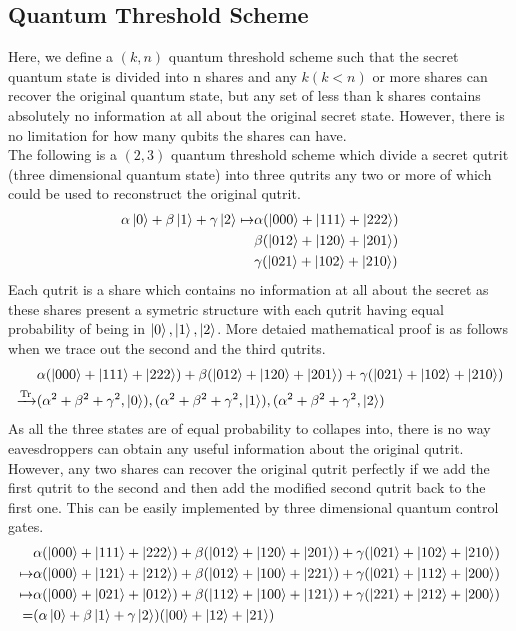\documentclass[12pt]{article}
\begin{document}
\subsection{Quantum Threshold Scheme}
Here, we define a $(k,n)$ quantum threshold scheme such that the secret quantum state is divided into n shares and any $k (k < n)$ or more shares can recover the original quantum state, but any set of less than k shares contains absolutely no information at all about the original secret state.
However, there is no limitation for how many qubits the shares can have.
\\
The following is a $(2,3)$ quantum threshold scheme which divide a secret qutrit (three dimensional quantum state) into three qutrits any two or more of which could be used to reconstruct the original qutrit.
\begin{align}
	\alpha \ket{0} + \beta \ket{1} + \gamma \ket{2} \mapsto
	& \alpha ( \ket{000} + \ket{111} + \ket{222} ) \nonumber \\
	& \beta  ( \ket{012} + \ket{120} + \ket{201} ) \nonumber \\
	& \gamma ( \ket{021} + \ket{102} + \ket{210} ) 
\end{align}
Each qutrit is a share which contains no information at all about the secret as these shares present a symetric structure with each qutrit having equal probability of being in $ \ket{0}, \ket{1}, \ket{2} $. More detaied mathematical proof is as follows when we trace out the second and the third qutrits.
\begin{align}
	& \alpha ( \ket{000} + \ket{111} + \ket{222} ) +
	\beta  ( \ket{012} + \ket{120} + \ket{201} ) + 
	\gamma ( \ket{021} + \ket{102} + \ket{210} )  \nonumber \\ 
	\xrightarrow{ \Tr}
	& (\alpha ^2 + \beta ^2 + \gamma ^2, \ket{0}), 
	(\alpha ^2 + \beta ^2 + \gamma ^2, \ket{1}),
	(\alpha ^2 + \beta ^2 + \gamma ^2, \ket{2}) 
\end{align}
As all the three states are of equal probability to collapes into, 
there is no way eavesdroppers can obtain any useful information about the original qutrit.
However, any two shares can recover the original qutrit perfectly if we add the first qutrit to the second and then add the modified second qutrit back to the first one. This can be easily implemented by three dimensional quantum control gates.
\begin{align}
	& \alpha ( \ket{000} + \ket{111} + \ket{222} ) +
	\beta  ( \ket{012} + \ket{120} + \ket{201} ) + 
	\gamma ( \ket{021} + \ket{102} + \ket{210} ) \nonumber \\ 
	\mapsto 
	& \alpha ( \ket{000} + \ket{121} + \ket{212} ) +
	\beta  ( \ket{012} + \ket{100} + \ket{221} ) + 
	\gamma ( \ket{021} + \ket{112} + \ket{200} ) \nonumber \\ 
	\mapsto
	& \alpha ( \ket{000} + \ket{021} + \ket{012} ) +
	\beta  ( \ket{112} + \ket{100} + \ket{121} ) + 
	\gamma ( \ket{221} + \ket{212} + \ket{200} ) \nonumber \\ 
	=
	& ( \alpha \ket{0} + \beta \ket{1} + \gamma \ket{2})
	(\ket{00} + \ket{12} + \ket{21})
\end{align}
\end{document}
